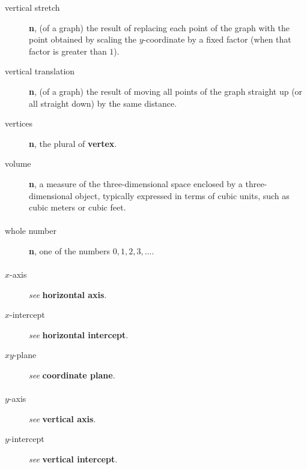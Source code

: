 \documentclass[10pt,]{book}
\newcommand{\terminology}[1]{\textbf{#1}}
\theoremstyle{plain}
\theoremstyle{definition}
\theoremstyle{definition}
\theoremstyle{definition}
\numberwithin{equation}{part}
\begin{document}
\begin{description}
\item[{vertical stretch}]\hypertarget{li-849}{}\terminology{n}, (of a graph) the result of replacing each point of the graph with the point obtained by scaling the \(y\)-coordinate by a fixed factor (when that factor is greater than \(1\)).%
\item[{vertical translation}]\hypertarget{li-850}{}\terminology{n}, (of a graph) the result of moving all points of the graph straight up (or all straight down) by the same distance.%
\item[{vertices}]\hypertarget{li-851}{}\terminology{n}, the plural of \terminology{vertex}.%
\item[{volume}]\hypertarget{li-852}{}\terminology{n}, a measure of the three-dimensional space enclosed by a three-dimensional object, typically expressed in terms of cubic units, such as cubic meters or cubic feet.%
\end{description}
%
\typeout{************************************************}
\typeout{************************************************}
\paragraph[{}]{}\hypertarget{paragraphs-26}{}
\leavevmode%
\begin{description}
\item[{whole number}]\hypertarget{li-853}{}\terminology{n}, one of the numbers \(0, 1, 2, 3, \ldots\).%
\end{description}
%
\typeout{************************************************}
\typeout{************************************************}
\paragraph[{}]{}\hypertarget{paragraphs-27}{}
\leavevmode%
\begin{description}
\item[{\(x\)-axis}]\hypertarget{li-854}{}\emph{see} \terminology{horizontal axis}.%
\item[{\(x\)-intercept}]\hypertarget{li-855}{}\emph{see} \terminology{horizontal intercept}.%
\item[{\(xy\)-plane}]\hypertarget{li-856}{}\emph{see} \terminology{coordinate plane}.%
\end{description}
%
\typeout{************************************************}
\typeout{************************************************}
\paragraph[{}]{}\hypertarget{paragraphs-28}{}
\leavevmode%
\begin{description}
\item[{\(y\)-axis}]\hypertarget{li-857}{}\emph{see} \terminology{vertical axis}.%
\item[{\(y\)-intercept}]\hypertarget{li-858}{}\emph{see} \terminology{vertical intercept}.%
\end{description}
%
\typeout{************************************************}
\typeout{************************************************}
\end{document}
